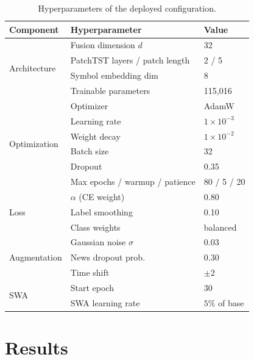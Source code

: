 \documentclass[runningheads]{llncs}
\begin{document}
\begin{table}[t]
\centering
\caption{Hyperparameters of the deployed configuration.}
\label{tab:hyper}
\begin{tabular}{lll}
\toprule
Component & Hyperparameter & Value \\
\midrule
\multirow{4}{*}{Architecture}
 & Fusion dimension $d$ & 32 \\
 & PatchTST layers / patch length & 2 / 5 \\
 & Symbol embedding dim & 8 \\
 & Trainable parameters & 115{,}016 \\
\midrule
\multirow{6}{*}{Optimization}
 & Optimizer & AdamW \\
 & Learning rate & $1\times10^{-3}$ \\
 & Weight decay & $1\times10^{-2}$ \\
 & Batch size & 32 \\
 & Dropout & 0.35 \\
 & Max epochs / warmup / patience & 80 / 5 / 20 \\
\midrule
\multirow{3}{*}{Loss}
 & $\alpha$ (CE weight) & 0.80 \\
 & Label smoothing & 0.10 \\
 & Class weights & balanced \\
\midrule
\multirow{3}{*}{Augmentation}
 & Gaussian noise $\sigma$ & 0.03 \\
 & News dropout prob.\ & 0.30 \\
 & Time shift & $\pm 2$ \\
\midrule
\multirow{2}{*}{SWA}
 & Start epoch & 30 \\
 & SWA learning rate & $5\%$ of base \\
\bottomrule
\end{tabular}
\end{table}

\section{Results}
\end{document}

